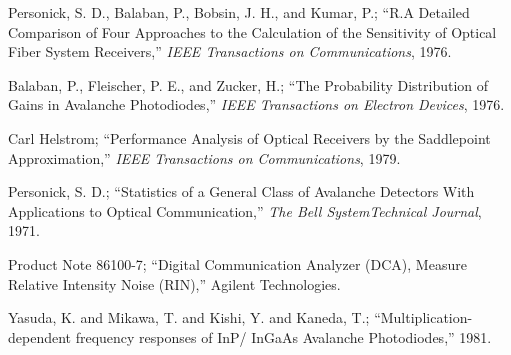 \documentclass[a4paper]{article}
\begin{document}
\begin{thebibliography}{9}
 Personick, S. D., Balaban, P., Bobsin, J. H., and Kumar, P.; ``R.A Detailed Comparison of Four Approaches to the Calculation of the Sensitivity of Optical Fiber System Receivers,'' \emph{IEEE Transactions on Communications}, 1976.

 Balaban, P., Fleischer, P. E., and Zucker, H.; ``The Probability Distribution of Gains in Avalanche Photodiodes,'' \emph{IEEE Transactions on Electron Devices}, 1976.

 Carl Helstrom; ``Performance Analysis of Optical Receivers by the Saddlepoint Approximation,'' \emph{IEEE Transactions on Communications}, 1979.

 Personick, S. D.; ``Statistics of a General Class of Avalanche Detectors With Applications to Optical Communication,'' \emph{The Bell SystemTechnical Journal}, 1971.

 Product Note 86100-7; ``Digital Communication Analyzer (DCA), Measure Relative Intensity Noise (RIN),'' Agilent Technologies. 

 Yasuda, K. and Mikawa, T. and Kishi, Y. and Kaneda, T.; ``Multiplication-dependent frequency responses of InP/ InGaAs Avalanche Photodiodes,'' 1981.



\end{thebibliography}
\end{document}
